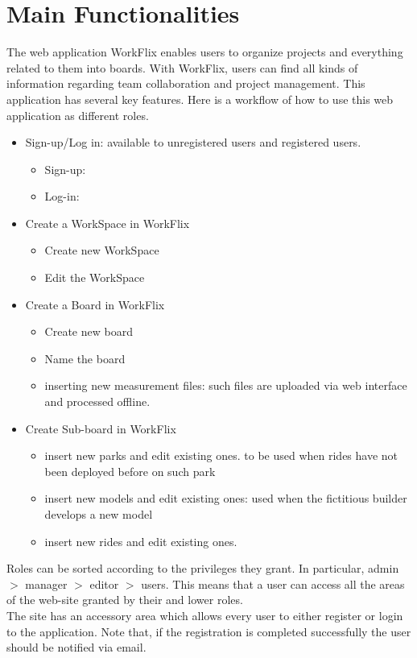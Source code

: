 \section{Main Functionalities}

The web application WorkFlix enables users to organize projects and everything related to them into boards.
With WorkFlix, users can find all kinds of information regarding team collaboration and project management.
This application has several key features. Here is a workflow of how to use this web application as different roles.

\begin{itemize}
    \item Sign-up/Log in: available to unregistered users and registered users. 
    \begin{itemize}
        \item Sign-up: 
        \item Log-in: 
    \end{itemize}
    \item Create a WorkSpace in WorkFlix
    \begin{itemize}
        \item Create new WorkSpace
        \item Edit the WorkSpace
    \end{itemize}
    \item Create a Board in WorkFlix
    \begin{itemize}
        \item Create new board
        \item Name the board
        \item inserting new measurement files: such files are uploaded via web interface and processed offline.
    \end{itemize}
    \item Create Sub-board in WorkFlix
    \begin{itemize}
        \item insert new parks and edit existing ones. to be used when rides have not been deployed before on such park
        \item insert new models and edit existing ones: used when the fictitious builder develops a new model
        \item insert new rides and edit existing ones.
    \end{itemize}
\end{itemize}


Roles can be sorted according to the privileges they grant. In particular, admin $>$ manager $>$ editor $>$ users. This means that a user can access all the areas of the web-site granted by their and lower roles.\\

The site has an accessory area which allows every user to either register or login to the application.
Note that, if the registration is completed successfully the user should be notified via email.



